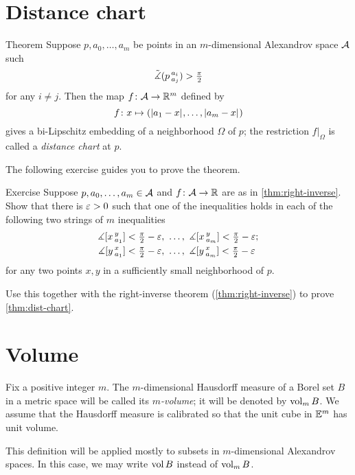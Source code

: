 \section{Distance chart}

\begin{thm}{Theorem}\label{thm:dist-chart}
Suppose $p,a_0,\dots,a_m$ be points in an $m$-dimensional Alexandrov space $\mathcal{A}$ such
\[\tilde\measuredangle(p\,{}^{a_i}_{a_j})>\tfrac\pi2\]
for any $i\ne j$.
Then the map $f\colon\mathcal{A}\to\mathbb{R}^m$ defined by
\[f\colon x\mapsto (|{a_1}-{x}|_{}^{{}},\dots,|{a_m}-{x}|_{}^{{}})\]
gives a bi-Lipschitz embedding of a neighborhood $\Omega$ of $p$;
the restriction $f|_\Omega$ is called a  \emph{distance chart} at $p$.
\end{thm}

The following exercise guides you to prove the theorem.

\begin{thm}{Exercise}\label{ex:proof-dist-chart}
Suppose $p,a_0,\dots,a_m\in\mathcal{A}$ and $f\colon\mathcal{A}\to\mathbb{R}$ are as in \ref{thm:right-inverse}.
Show that there is $\varepsilon>0$ such that one of the inequalities holds in each of the following two strings of $m$  inequalities
\begin{align*}
\measuredangle[x\,{}^{y}_{a_1}]&<\tfrac\pi2-\varepsilon,\ \dots,\  \measuredangle[x\,{}^{y}_{a_m}]<\tfrac\pi2-\varepsilon;
\\
\measuredangle[y\,{}^{x}_{a_1}]&<\tfrac\pi2-\varepsilon,\ \dots,\ \measuredangle[y\,{}^{x}_{a_m}]<\tfrac\pi2-\varepsilon
\end{align*}
for any two points $x,y$ in a sufficiently small neighborhood of $p$.

Use this together with the right-inverse theorem (\ref{thm:right-inverse}) to prove \ref{thm:dist-chart}.
\end{thm}

\section{Volume}

Fix a positive integer $m$.
The $m$-dimensional Hausdorff measure of a Borel set $B$ in a metric space will be called its \emph{$m$-volume}; it will be denoted by $\operatorname{\rm vol}\nolimits_m B$.
We assume that the Hausdorff measure is calibrated so that the unit cube in $\mathbb{E}^m$ has unit volume.

This definition will be applied mostly to subsets in $m$-dimensional Alexandrov spaces.
In this case, we may write $\operatorname{\rm vol}\nolimits B$ instead of $\operatorname{\rm vol}\nolimits_m B$.

\pagebreak[2]

